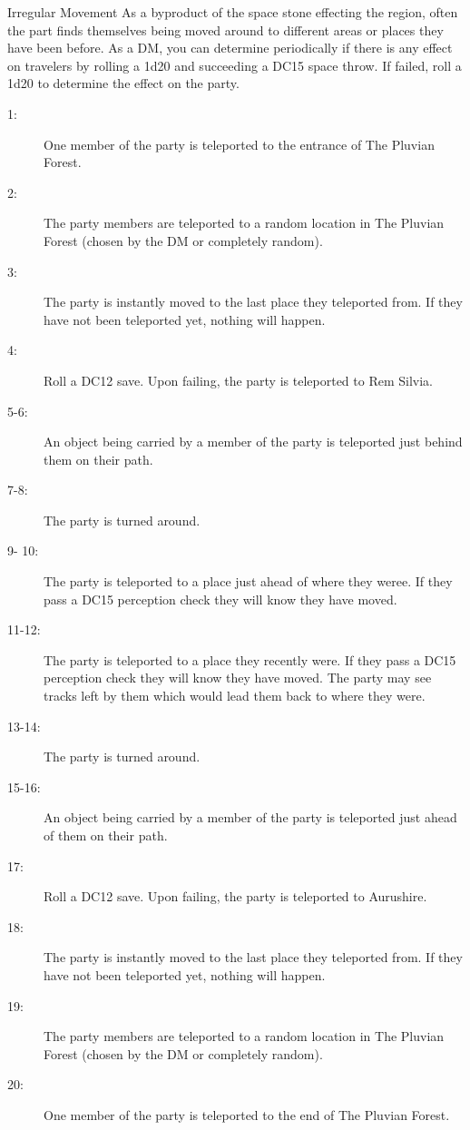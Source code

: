\documentclass[letterpaper,10pt,twoside,twocolumn,openany]{book}
\begin{document}
\begin{commentbox}{Irregular Movement}
	As a byproduct of the space stone effecting the region, often the part finds themselves being moved around to different areas or places they have been before. As a DM, you can determine periodically if there is any effect on travelers by rolling a 1d20 and succeeding a DC15 space throw. If failed, roll a 1d20 to determine the effect on the party.
	\hline
	\begin{description}
		\item[1:] One member of the party is teleported to the entrance of The Pluvian Forest.
		\item[2:] The party members are teleported to a random location in The Pluvian Forest (chosen by the DM or completely random).
		\item[3:] The party is instantly moved to the last place they teleported from. If they have not been teleported yet, nothing will happen.
		\item[4:] Roll a DC12 save. Upon failing, the party is teleported to Rem Silvia.
		\item[5-6:] An object being carried by a member of the party is teleported just behind them on their path.
		\item[7-8:] The party is turned around.
		\item[9- 10:] The party is teleported to a place just ahead of where they weree. If they pass a DC15 perception check they will know they have moved. 
		\item[11-12:] The party is teleported to a place they recently were. If they pass a DC15 perception check they will know they have moved. The party may see tracks left by them which would lead them back to where they were.
		\item[13-14:] The party is turned around.
		\item[15-16:] An object being carried by a member of the party is teleported just ahead of them on their path. 
		\item[17:] Roll a DC12 save. Upon failing, the party is teleported to Aurushire.
		\item[18:] The party is instantly moved to the last place they teleported from. If they have not been teleported yet, nothing will happen.
		\item[19:] The party members are teleported to a random location in The Pluvian Forest (chosen by the DM or completely random).
		\item[20:] One member of the party is teleported to the end of The Pluvian Forest.
	\end{description}
\end{commentbox}
\end{document}
